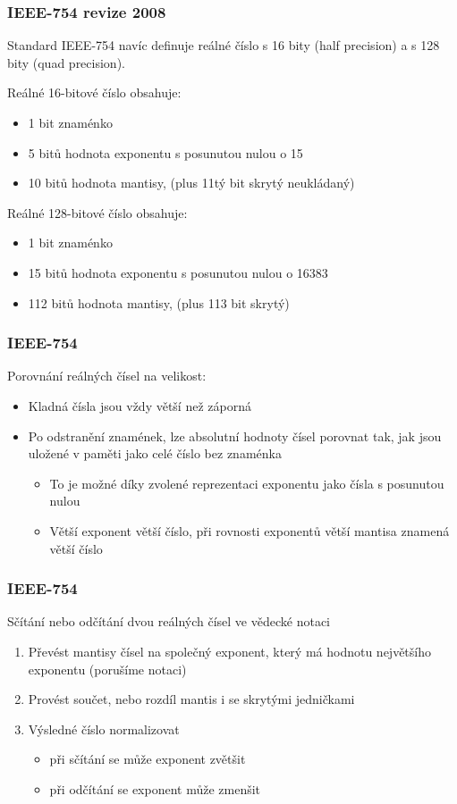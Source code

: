 \begin{frame}
\frametitle{IEEE-754 revize 2008 }

Standard IEEE-754 navíc definuje reálné číslo s 16 bity (half precision) a s 128 bity (quad precision).

Reálné 16-bitové číslo obsahuje:
\begin{itemize}
\item 1 bit znaménko 
\item 5 bitů hodnota exponentu s posunutou nulou o 15
\item 10 bitů hodnota mantisy, (plus 11tý bit skrytý neukládaný)
\end{itemize}
\bigskip
Reálné 128-bitové číslo obsahuje:
\begin{itemize}
\item 1 bit znaménko 
\item 15 bitů hodnota exponentu s posunutou nulou o 16383
\item 112 bitů hodnota mantisy, (plus 113 bit skrytý)
\end{itemize}

\end{frame}


\begin{frame}
\frametitle{IEEE-754 }

Porovnání reálných čísel na velikost:
\begin{itemize}
\item Kladná čísla jsou vždy větší než záporná
\item Po odstranění znamének, lze absolutní hodnoty čísel porovnat tak, jak jsou uložené v paměti jako celé číslo bez znaménka
\begin{itemize}
\item To je možné díky zvolené reprezentaci exponentu jako čísla s posunutou nulou
\item Větší exponent větší číslo, při rovnosti exponentů větší mantisa znamená větší číslo
\end{itemize}
\end{itemize}
\end{frame}


\begin{frame}
\frametitle{IEEE-754}

Sčítání nebo odčítání dvou reálných čísel ve vědecké notaci
\begin{enumerate}
\item Převést mantisy čísel na společný exponent, který má hodnotu největšího exponentu (porušíme notaci)
\item Provést součet, nebo rozdíl mantis i se skrytými jedničkami
\item Výsledné číslo normalizovat
\begin{itemize}
\item při sčítání se může exponent zvětšit
\item při odčítání se exponent může zmenšit
\end{itemize}
\end{enumerate}

\end{frame}



